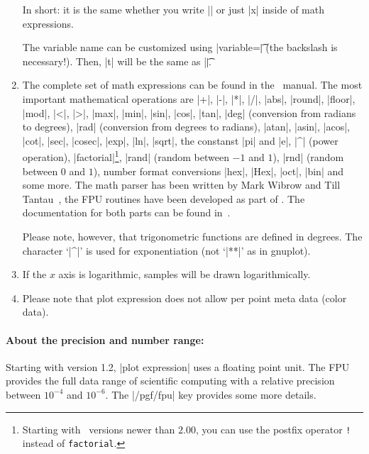 \begin{addplotoperation}[]{}{}
\begin{enumerate}
	In short: it is the same whether you write |\x| or just |x| inside of math expressions.

	The variable name can be customized using |variable=\t| (the backslash is necessary!). Then, |t| will be the same as |\t|.
%

	\item The complete set of math expressions can be found in the \PGF\ manual. The most important mathematical operations are
	|+|, |-|, |*|, |/|, |abs|, |round|, |floor|, |mod|, |<|, |>|, |max|, |min|, |sin|, |cos|, |tan|, |deg| (conversion from radians to degrees), |rad| (conversion from degrees to radians), |atan|, |asin|, |acos|, |cot|, |sec|, |cosec|, |exp|, |ln|, |sqrt|, the constanst |pi| and |e|, |^| (power operation), |factorial|\footnote{Starting with \PGF\ versions newer than $2.00$, you can use the postfix operator \texttt{!} instead of \texttt{factorial}.}, |rand| (random between $-1$ and $1$), |rnd| (random between $0$ and $1$), number format conversions |hex|, |Hex|, |oct|, |bin| and some more. The math parser has been written by Mark Wibrow and Till Tantau~\cite{tikz}, the FPU routines have been developed as part of \PGFPlots. The documentation for both parts can be found in~\cite{tikz}.
	
	Please note, however, that trigonometric functions are defined in degrees. The character `|^|' is used for exponentiation (not `|**|' as in gnuplot).

	\item If the $x$ axis is logarithmic, samples will be drawn logarithmically.

	\item Please note that plot expression does not allow per point meta data (color data).
\end{enumerate}

\paragraph{About the precision and number range:}
%
%
	 Starting with version 1.2, |plot expression| uses a floating point unit. The FPU provides the full data range of scientific computing with a relative precision between $10^{-4}$ and $10^{-6}$. The |/pgf/fpu| key provides some more details. 


\end{addplotoperation}
